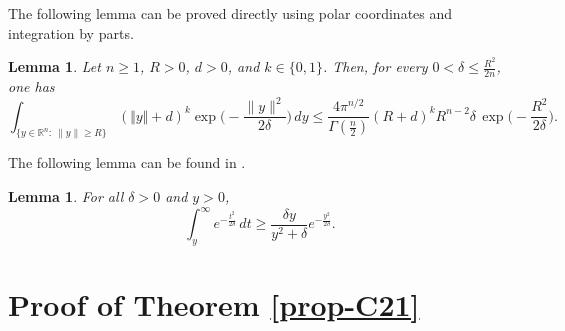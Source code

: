 \documentclass[11pt]{amsart}
\newcommand{\1}{\mathds{1}}
\newtheorem{lemma}[theorem]{Lemma}
\theoremstyle{definition}
\theoremstyle{remark}
\theoremstyle{definition}
\newcommand{\R}{\mathbb{R}}
\begin{document}
The following lemma can be proved directly using polar coordinates and integration by parts.
\begin{lemma}\label{Lemma-integral2}
Let $n\ge 1$, $R>0$, $d>0$, and $k\in \{0,1\}$. Then, for every $0<\delta\le \frac{R^2}{2n}$, one has
\[
\int_{\{y\in\R^n:\ \|y\|\ge R\}} (\Vert y\Vert +d)^k\exp\!\Big(-\frac{\|y\|^2}{2\delta}\Big)\,dy
\le
\frac{4\pi^{n/2}}{\Gamma\!\left(\frac n2\right)} (R+d)^k R^{n-2}\delta\,
\exp\!\Big(-\frac{R^2}{2\delta}\Big).
\]
\end{lemma}
The following lemma can be found in \cite{MR5558}.
\begin{lemma}\label{cota-inf-normal} For all $\delta>0$ and $y>0$,
$$
\int_{y}^{\infty}e^{-\frac{t^2}{2\delta}}\,dt\geq \frac{\delta y}{y^2+\delta}e^{-\frac{y^2}{2\delta}}.
$$ 
\end{lemma}

\section{Proof of Theorem \ref{prop-C21}}\label{proof43}
\end{document}
